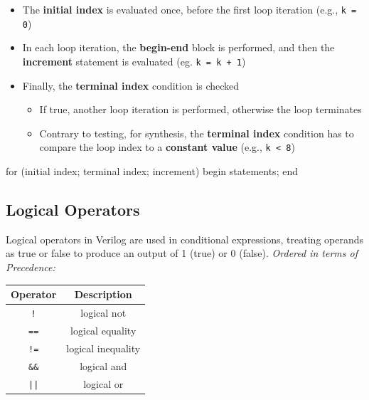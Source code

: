 \documentclass[12pt,openany]{book}
\begin{document}
\noindent
\hspace*{-30px}
\begin{minipage}[htp]{0.6\textwidth}
\begin{itemize}
    \item[] The \textbf{initial index} is evaluated once, before the first loop iteration (e.g., \texttt{k = 0})
    \item[] In each loop iteration, the \textbf{begin-end} block is performed, and then the \textbf{increment} statement is evaluated (eg. \texttt{k = k + 1})
    \item[] Finally, the \textbf{terminal index} condition is checked
    \begin{itemize}
        \item If true, another loop iteration is performed, otherwise the loop terminates
        \item Contrary to testing, for synthesis, the \textbf{terminal index} condition has to compare the loop index to a \textbf{constant value} (e.g., \texttt{k < 8})
    \end{itemize}
\end{itemize}
\end{minipage}
\hfill
\begin{minipage}[htp]{0.40\textwidth}
\begin{vhdl}
for (initial index; terminal index; increment)
begin
	statements;
end
\end{vhdl}
\end{minipage}

\subsection{Logical Operators}
Logical operators in Verilog are used in conditional expressions, treating operands as true or false to produce an output of 1 (true) or 0 (false).
\textit{Ordered in terms of Precedence:}
\begin{center}
    \begin{table}[h!]
        \centering
        \begin{tabular}{c|c}
            \hline
            \textbf{Operator} & \textbf{Description} \\
            \hline
            \texttt{!} & logical not \\
            \texttt{==} & logical equality \\
            \texttt{!=} & logical inequality \\
            \texttt{\&\&} & logical and \\
            \texttt{||} & logical or \\
            \hline
        \end{tabular}
    \end{table}
\end{center}
\end{document}
